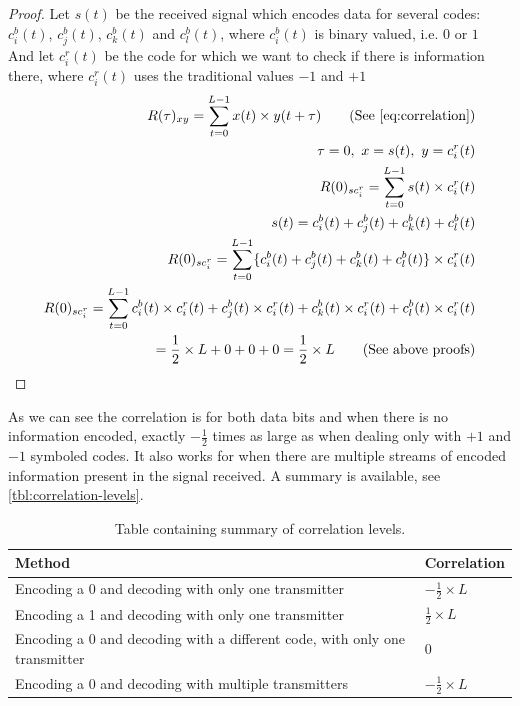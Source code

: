 		\begin{proof}
			Let $s(t)$ be the received signal which encodes data for several codes: $c^b_i(t)$, $c^b_j(t)$, $c^b_k(t)$ and $c^b_l(t)$, where $c^b_i(t)$ is binary valued, i.e. $0$ or $1$\\
			And let $c^r_i(t)$ be the code for which we want to check if there is information there, where $c^r_i(t)$ uses the traditional values $-1$ and $+1$ \\

			\begin{align*}
				R(\tau)_{xy} = \displaystyle\sum_{t = 0} ^ {L - 1} x(t) \times y(t + \tau)	\tag{See \autoref{eq:correlation}}
				\\ \tau = 0,\ x = s(t),\ y = c^r_i(t)	
				\\ R(0)_{sc^r_{i}} = \displaystyle\sum_{t = 0} ^ {L - 1} s(t) \times c^r_i(t)	
				\\ s(t) = c^b_i(t) + c^b_j(t) + c^b_k(t) + c^b_l(t)															
				\\ R(0)_{sc^r_{i}} = \displaystyle\sum_{t = 0} ^ {L - 1} \{ c^b_i(t) + c^b_j(t) + c^b_k(t) + c^b_l(t) \} \times c^r_i(t)
				\\ R(0)_{sc^r_{i}} = \displaystyle\sum_{t = 0} ^ {L - 1} c^b_i(t) \times c^r_i(t) + c^b_j(t) \times c^r_i(t) + c^b_k(t) \times c^r_i(t) + c^b_l(t) \times c^r_i(t)
				\\ = \frac{1}{2} \times L + 0 + 0 + 0 = \frac{1}{2} \times L \tag{See above proofs}
			\end{align*}

		\end{proof}




		As we can see the correlation is for both data bits and when there is no information encoded, exactly $-\frac{1}{2}$ times as large as when dealing only with $+1$ and $-1$ symboled codes. 
		It also works for when there are multiple streams of encoded information present in the signal received.
		A summary is available, see \autoref{tbl:correlation-levels}.

		\begin{table}[h!]
			\centering
			
			\begin{tabular}{| l | l |}
				\hline
				Method												& Correlation \\ \hline \hline
				Encoding a 0 and decoding with only one transmitter & $-\frac{1}{2} \times L$  \\ \hline
				Encoding a 1 and decoding with only one transmitter & $ \frac{1}{2} \times L$   \\ \hline
				Encoding a 0 and decoding with a different code, with only one transmitter & 0  \\ \hline
				Encoding a 0 and decoding with multiple transmitters & $-\frac{1}{2} \times L$ \\ \hline
			\end{tabular}
			\caption{Table containing summary of correlation levels.}
			\label{tbl:correlation-levels}
		\end{table}









